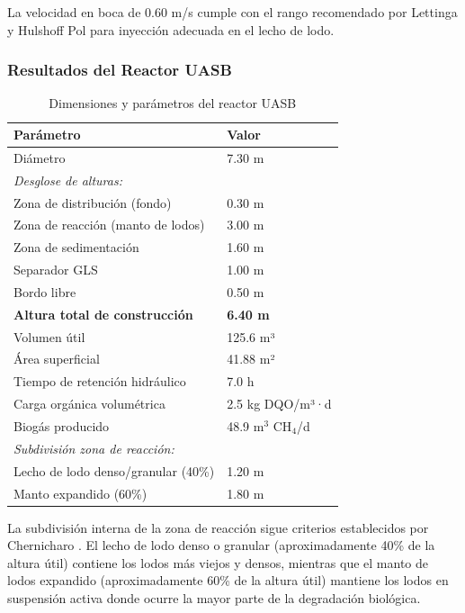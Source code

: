 \documentclass[12pt,a4paper]{article}
\begin{document}
La velocidad en boca de 0.60 m/s cumple con el rango recomendado por Lettinga y Hulshoff Pol para inyección adecuada en el lecho de lodo.

\subsubsection{Resultados del Reactor UASB}

\begin{table}[H]
\centering
\caption{Dimensiones y parámetros del reactor UASB}
\begin{tabular}{ll}
\toprule
Parámetro & Valor \\
\midrule
Diámetro & 7.30 m \\
\multicolumn{2}{l}{\textit{Desglose de alturas:}} \\
\quad Zona de distribución (fondo) & 0.30 m \\
\quad Zona de reacción (manto de lodos) & 3.00 m \\
\quad Zona de sedimentación & 1.60 m \\
\quad Separador GLS & 1.00 m \\
\quad Bordo libre & 0.50 m \\
\midrule
\textbf{Altura total de construcción} & \textbf{6.40 m} \\
\midrule
Volumen útil & 125.6 m³ \\
Área superficial & 41.88 m² \\
Tiempo de retención hidráulico & 7.0 h \\
Carga orgánica volumétrica & 2.5 kg DQO/m³·d \\
Biogás producido & 48.9 m$^3$ CH$_4$/d \\
\midrule
\multicolumn{2}{l}{\textit{Subdivisión zona de reacción:}} \\
\quad Lecho de lodo denso/granular (40\%) & 1.20 m \\
\quad Manto expandido (60\%) & 1.80 m \\
\bottomrule
\end{tabular}
\end{table}

La subdivisión interna de la zona de reacción sigue criterios establecidos por Chernicharo \cite{chernicharo2007}. El lecho de lodo denso o granular (aproximadamente 40\% de la altura útil) contiene los lodos más viejos y densos, mientras que el manto de lodos expandido (aproximadamente 60\% de la altura útil) mantiene los lodos en suspensión activa donde ocurre la mayor parte de la degradación biológica.
\end{document}
